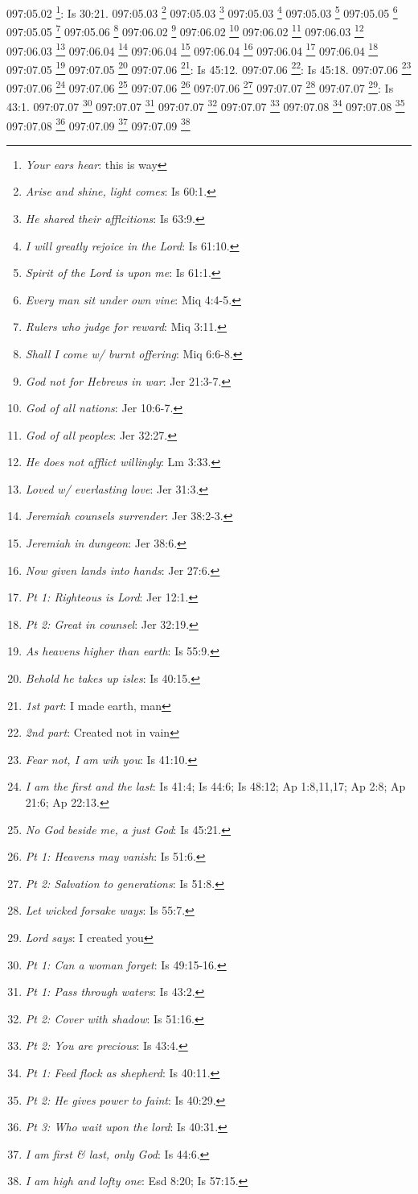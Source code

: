 {{{{{{{{{{{{{{{{{097:05.02 \footnote{\textit{Your ears hear}: this is way}: Is 30:21.}
097:05.03 \footnote{\textit{Arise and shine, light comes}: Is 60:1.}
097:05.03 \footnote{\textit{He shared their afflcitions}: Is 63:9.}
097:05.03 \footnote{\textit{I will greatly rejoice in the Lord}: Is 61:10.}
097:05.03 \footnote{\textit{Spirit of the Lord is upon me}: Is 61:1.}
097:05.05 \footnote{\textit{Every man sit under own vine}: Miq 4:4-5.}
097:05.05 \footnote{\textit{Rulers who judge for reward}: Miq 3:11.}
097:05.06 \footnote{\textit{Shall I come w/ burnt offering}: Miq 6:6-8.}
097:06.02 \footnote{\textit{God not for Hebrews in war}: Jer 21:3-7.}
097:06.02 \footnote{\textit{God of all nations}: Jer 10:6-7.}
097:06.02 \footnote{\textit{God of all peoples}: Jer 32:27.}
097:06.03 \footnote{\textit{He does not afflict willingly}: Lm 3:33.}
097:06.03 \footnote{\textit{Loved w/ everlasting love}: Jer 31:3.}
097:06.04 \footnote{\textit{Jeremiah counsels surrender}: Jer 38:2-3.}
097:06.04 \footnote{\textit{Jeremiah in dungeon}: Jer 38:6.}
097:06.04 \footnote{\textit{Now given lands into hands}: Jer 27:6.}
097:06.04 \footnote{\textit{Pt 1: Righteous is Lord}: Jer 12:1.}
097:06.04 \footnote{\textit{Pt 2: Great in counsel}: Jer 32:19.}
097:07.05 \footnote{\textit{As heavens higher than earth}: Is 55:9.}
097:07.05 \footnote{\textit{Behold he takes up isles}: Is 40:15.}
097:07.06 \footnote{\textit{1st part}: I made earth, man}: Is 45:12.}
097:07.06 \footnote{\textit{2nd part}: Created not in vain}: Is 45:18.}
097:07.06 \footnote{\textit{Fear not, I am wih you}: Is 41:10.}
097:07.06 \footnote{\textit{I am the first and the last}: Is 41:4; Is 44:6; Is 48:12; Ap 1:8,11,17; Ap 2:8; Ap 21:6; Ap 22:13.}
097:07.06 \footnote{\textit{No God beside me, a just God}: Is 45:21.}
097:07.06 \footnote{\textit{Pt 1: Heavens may vanish}: Is 51:6.}
097:07.06 \footnote{\textit{Pt 2: Salvation to generations}: Is 51:8.}
097:07.07 \footnote{\textit{Let wicked forsake ways}: Is 55:7.}
097:07.07 \footnote{\textit{Lord says}: I created you}: Is 43:1.}
097:07.07 \footnote{\textit{Pt 1: Can a woman forget}: Is 49:15-16.}
097:07.07 \footnote{\textit{Pt 1: Pass through waters}: Is 43:2.}
097:07.07 \footnote{\textit{Pt 2: Cover with shadow}: Is 51:16.}
097:07.07 \footnote{\textit{Pt 2: You are precious}: Is 43:4.}
097:07.08 \footnote{\textit{Pt 1: Feed flock as shepherd}: Is 40:11.}
097:07.08 \footnote{\textit{Pt 2: He gives power to faint}: Is 40:29.}
097:07.08 \footnote{\textit{Pt 3: Who wait upon the lord}: Is 40:31.}
097:07.09 \footnote{\textit{I am first & last, only God}: Is 44:6.}
097:07.09 \footnote{\textit{I am high and lofty one}: Esd 8:20; Is 57:15.}
}}}}}}}}}}}}}

